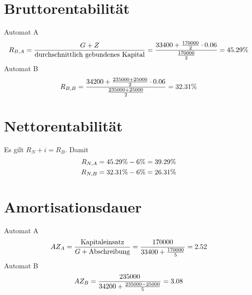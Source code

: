 \documentclass{article}
\begin{document}
	\section*{Bruttorentabilität}
	Automat A
	\begin{align}
		R_{B,A} = \frac{G + Z}{\text{durchschnittlich gebundenes Kapital}} = \frac{33400 + \frac{170000}{2}\cdot 0.06}{\frac{170000}{2}} = 45.29\% \notag
	\end{align}
	Automat B
	\begin{align}
		R_{B,B} = \frac{34200 + \frac{235000 + 25000}{2}\cdot 0.06}{\frac{235000 + 25000}{2}} = 32.31\% \notag
	\end{align}
	
	\section*{Nettorentabilität}
	Es gilt $R_N + i = R_B$. Damit
	\begin{align}
		R_{N,A} &= 45.29\% - 6\% = 39.29\% \notag \\
		R_{N,B} &= 32.31\% - 6\% = 26.31\% \notag
	\end{align}
	
	\section*{Amortisationsdauer}
	Automat A
	\begin{align}
		AZ_A = \frac{\text{Kapitaleinsatz}}{G + \text{Abschreibung}} = \frac{170000}{33400 + \frac{170000}{5}} = 2.52 \notag
	\end{align}
	Automat B
	\begin{align}
		AZ_B = \frac{235000}{34200 + \frac{235000-25000}{5}} = 3.08 \notag
	\end{align}
	
\end{document}
